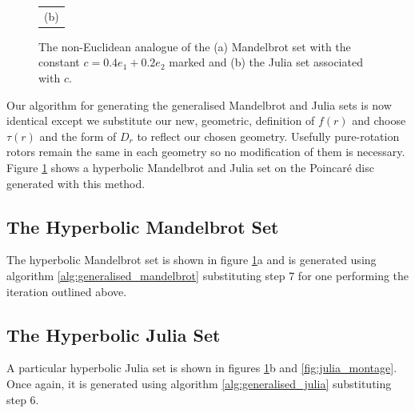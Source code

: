 \begin{figure}[p]
\begin{tabular}{c}
                          (b)
\end{tabular}
\caption{\label{fig:noneuclidean_sets}The non-Euclidean analogue of the (a) Mandelbrot set with
  the constant $c = 0.4e_1 + 0.2e_2$ marked and (b) the Julia
  set associated with $c$.}
\end{figure}

Our algorithm for generating the generalised Mandelbrot and Julia sets is now identical
except we substitute our new, geometric, definition of $f(r)$ and choose $\tau(r)$
and the form of $D_r$ to reflect our chosen geometry. Usefully pure-rotation rotors remain
the same in each geometry so no modification of them is necessary. Figure
\ref{fig:noneuclidean_sets} shows a hyperbolic Mandelbrot and Julia set on the
Poincar\'e disc generated with this method. 

\subsection{The Hyperbolic Mandelbrot Set}

The hyperbolic Mandelbrot set is shown in figure \ref{fig:noneuclidean_sets}a and
is generated using algorithm \ref{alg:generalised_mandelbrot} substituting
step 7 for one performing the iteration outlined above. 

\subsection{The Hyperbolic Julia Set}

A particular hyperbolic Julia set is shown in figures \ref{fig:noneuclidean_sets}b
and \ref{fig:julia_montage}.  Once again, it is generated using algorithm
\ref{alg:generalised_julia} substituting step 6.

